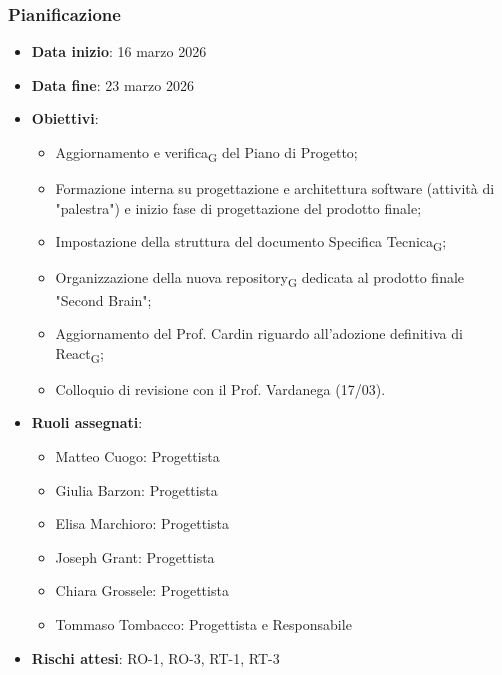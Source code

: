 \documentclass[11pt,a4paper]{article}
\newcommand{\gls}[1]{#1\textsubscript{G}}
\begin{document}
\subsubsection{Pianificazione}
\begin{itemize}
    \item \textbf{Data inizio}: 16 marzo 2026
    \item \textbf{Data fine}: 23 marzo 2026
    \item \textbf{Obiettivi}:
    \begin{itemize}
        \item Aggiornamento e \gls{verifica} del Piano di Progetto;
        \item Formazione interna su progettazione e architettura software (attività di "palestra") e inizio fase di progettazione del prodotto finale;
        \item Impostazione della struttura del documento \gls{Specifica Tecnica};
        \item Organizzazione della nuova \gls{repository} dedicata al prodotto finale "Second Brain";
        \item Aggiornamento del Prof. Cardin riguardo all'adozione definitiva di \gls{React};
        \item Colloquio di revisione con il Prof. Vardanega (17/03).
    \end{itemize}
    
    \item \textbf{Ruoli assegnati}:
    \begin{itemize}
        \item Matteo Cuogo: Progettista
        \item Giulia Barzon: Progettista
        \item Elisa Marchioro: Progettista
        \item Joseph Grant: Progettista
        \item Chiara Grossele: Progettista
        \item Tommaso Tombacco: Progettista e Responsabile
    \end{itemize}
    \item \textbf{Rischi attesi}: RO-1, RO-3, RT-1, RT-3
\end{itemize}
\end{document}
